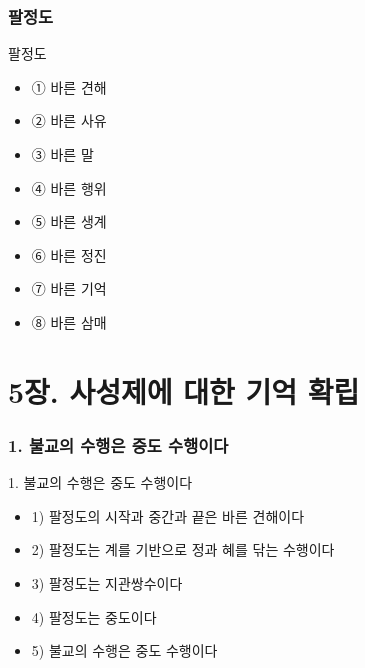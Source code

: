 \documentclass[aspectratio=1610,14pt,xcolor=pdftex,dvipsnames,table,handout]{beamer}
\begin{document}
		\section{팔정도 }
		\frame [plain] {\sectionpage}

		\begin{frame} [t,plain]
			\begin{block} {팔정도 }
			\begin{itemize}
				\item ① 바른 견해
				\item ② 바른 사유
				\item ③ 바른 말
				\item ④ 바른 행위
				\item ⑤ 바른 생계
				\item ⑥ 바른 정진
				\item ⑦ 바른 기억
				\item ⑧ 바른 삼매
			\end{itemize}
			\end{block}
		\end{frame}


		\part{5장. 사성제에 대한 기억 확립}
		\frame{\partpage}


		\section{1. 불교의 수행은 중도 수행이다}
		\frame [plain] {\sectionpage}

		\begin{frame} [t,plain]
			\begin{block} {1. 불교의 수행은 중도 수행이다}
			\begin{itemize}
				\item 1) 팔정도의 시작과 중간과 끝은 바른 견해이다
				\item 2) 팔정도는 계를 기반으로 정과 혜를 닦는 수행이다
				\item 3) 팔정도는 지관쌍수이다
				\item 4) 팔정도는 중도이다
				\item 5) 불교의 수행은 중도 수행이다
			\end{itemize}
			\end{block}
		\end{frame}
\end{document}
